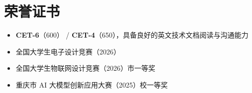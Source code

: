 \documentclass{customcv}
\begin{document}
\section{荣誉证书}
\begin{itemize}
  \item \textbf{CET-6}（600） / \textbf{CET-4}（650），具备良好的英文技术文档阅读与沟通能力
  \item 全国大学生电子设计竞赛（2026）
  \item 全国大学生物联网设计竞赛（2026）市一等奖
  \item 重庆市 AI 大模型创新应用大赛（2025）校一等奖
\end{itemize}
\end{document}
